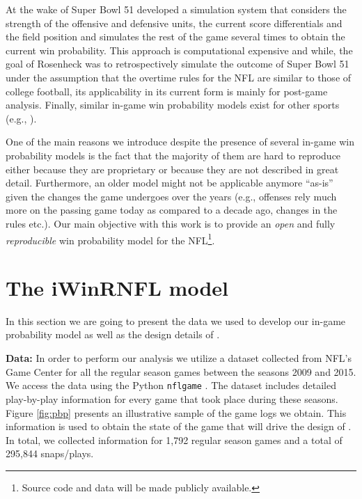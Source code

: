 \documentclass{sig-alternate}
\begin{document}
At the wake of Super Bowl 51 \cite{rosenheck17} developed a simulation system that considers the strength of the offensive and defensive units, the current score differentials and the field position and simulates the rest of the game several times to obtain the current win probability.  
This approach is computational expensive and while, the goal of Rosenheck was to retrospectively simulate the outcome of Super Bowl 51 under the assumption that the overtime rules for the NFL are similar to those of college football, its applicability in its current form is mainly for post-game analysis.  
Finally, similar in-game win probability models exist for other sports (e.g., \cite{buttrey2011estimating,stern1994brownian}). 

One of the main reasons we introduce {\method} despite the presence of several in-game win probability models is the fact that the majority of them are hard to reproduce either because they are proprietary or because they are not described in great detail.  
Furthermore, an older model might not be applicable anymore ``as-is'' given the changes the game undergoes over the years (e.g., offenses rely much more on the passing game today as compared to a decade ago, changes in the rules etc.). 
Our main objective with this work is to provide an {\em open} and fully {\em reproducible} win probability model for the NFL\footnote{Source code and data will be made publicly available.}. 


\section{The iWinRNFL model}
\label{sec:model}

In this section we are going to present the data we used to develop our in-game probability model as well as the design details of {\method}. 

{\bf Data: }In order to perform our analysis we utilize a dataset collected from NFL's Game Center for all the regular season games between the seasons 2009 and 2015. 
We access the data using the Python {\tt nflgame} \cite{nflgame}. 
The dataset includes detailed play-by-play information for every game that took place during these seasons. 
Figure \ref{fig:pbp} presents an illustrative sample of the game logs we obtain. 
This information is used to obtain the state of the game that will drive the design of {\method}. 
In total, we collected information for 1,792 regular season games and a total of 295,844 snaps/plays. 
\end{document}
